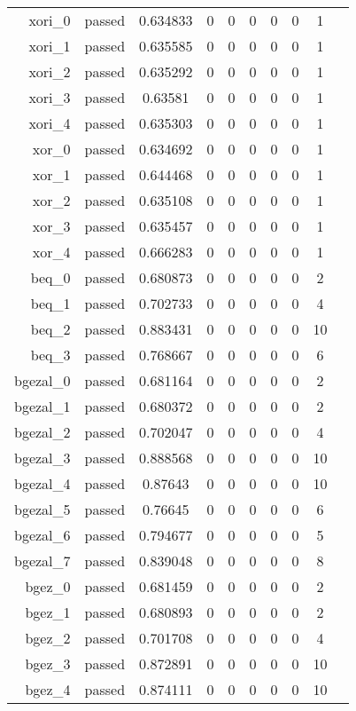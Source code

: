 \begin{longtable}{r|ccccccccc}
    xori\_0 & passed & 0.634833 & 0 & 0 & 0 & 0 & 0 & 1 \\
    xori\_1 & passed & 0.635585 & 0 & 0 & 0 & 0 & 0 & 1 \\
    xori\_2 & passed & 0.635292 & 0 & 0 & 0 & 0 & 0 & 1 \\
    xori\_3 & passed & 0.63581 & 0 & 0 & 0 & 0 & 0 & 1 \\
    xori\_4 & passed & 0.635303 & 0 & 0 & 0 & 0 & 0 & 1 \\
    xor\_0 & passed & 0.634692 & 0 & 0 & 0 & 0 & 0 & 1 \\
    xor\_1 & passed & 0.644468 & 0 & 0 & 0 & 0 & 0 & 1 \\
    xor\_2 & passed & 0.635108 & 0 & 0 & 0 & 0 & 0 & 1 \\
    xor\_3 & passed & 0.635457 & 0 & 0 & 0 & 0 & 0 & 1 \\
    xor\_4 & passed & 0.666283 & 0 & 0 & 0 & 0 & 0 & 1 \\
    beq\_0 & passed & 0.680873 & 0 & 0 & 0 & 0 & 0 & 2 \\
    beq\_1 & passed & 0.702733 & 0 & 0 & 0 & 0 & 0 & 4 \\
    beq\_2 & passed & 0.883431 & 0 & 0 & 0 & 0 & 0 & 10 \\
    beq\_3 & passed & 0.768667 & 0 & 0 & 0 & 0 & 0 & 6 \\
    bgezal\_0 & passed & 0.681164 & 0 & 0 & 0 & 0 & 0 & 2 \\
    bgezal\_1 & passed & 0.680372 & 0 & 0 & 0 & 0 & 0 & 2 \\
    bgezal\_2 & passed & 0.702047 & 0 & 0 & 0 & 0 & 0 & 4 \\
    bgezal\_3 & passed & 0.888568 & 0 & 0 & 0 & 0 & 0 & 10 \\
    bgezal\_4 & passed & 0.87643 & 0 & 0 & 0 & 0 & 0 & 10 \\
    bgezal\_5 & passed & 0.76645 & 0 & 0 & 0 & 0 & 0 & 6 \\
    bgezal\_6 & passed & 0.794677 & 0 & 0 & 0 & 0 & 0 & 5 \\
    bgezal\_7 & passed & 0.839048 & 0 & 0 & 0 & 0 & 0 & 8 \\
    bgez\_0 & passed & 0.681459 & 0 & 0 & 0 & 0 & 0 & 2 \\
    bgez\_1 & passed & 0.680893 & 0 & 0 & 0 & 0 & 0 & 2 \\
    bgez\_2 & passed & 0.701708 & 0 & 0 & 0 & 0 & 0 & 4 \\
    bgez\_3 & passed & 0.872891 & 0 & 0 & 0 & 0 & 0 & 10 \\
    bgez\_4 & passed & 0.874111 & 0 & 0 & 0 & 0 & 0 & 10 \\

\end{longtable}
